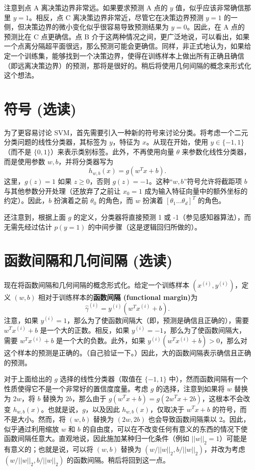 注意到点 A 离决策边界非常远。如果要求预测 A 点的 $y$ 值，似乎应该非常确信那里 $y=1$。相反，点 C 离决策边界非常近，尽管它在决策边界预测 $y=1$ 的一侧，但决策边界的微小变化似乎很容易导致预测结果为 $y=0$。因此，在 A 点的预测比在 C 点更确信。点 B 介于这两种情况之间，更广泛地说，可以看出，如果一个点离分隔超平面很远，那么预测可能会更确信。同样，非正式地认为，如果给定一个训练集，能够找到一个决策边界，使得在训练样本上做出所有正确且确信（即远离决策边界）的预测，那将是很好的。稍后将使用几何间隔的概念来形式化这个想法。

\section{符号 (选读)}

为了更容易讨论 SVM，首先需要引入一种新的符号来讨论分类。将考虑一个二元分类问题的线性分类器，其标签为 $y$，特征为 $x$。从现在开始，使用 $y \in \{-1, 1\}$（而不是 $\{0, 1\}$）来表示类别标签。此外，不再使用向量 $\theta$ 来参数化线性分类器，而是使用参数 $w, b$，并将分类器写为
\[
    h_{w,b}(x) = g(w^T x + b).
\]
这里，$g(z) = 1$ 如果 $z \ge 0$，否则 $g(z) = -1$。这种“$w, b$”符号允许将截距项 $b$ 与其他参数分开处理（还放弃了之前让 $x_0 = 1$ 成为输入特征向量中的额外坐标的约定）。因此，$b$ 扮演着之前 $\theta_0$ 的角色，而 $w$ 扮演着 $[\theta_1 \dots \theta_d]^T$ 的角色。

还注意到，根据上面 $g$ 的定义，分类器将直接预测 1 或 -1（参见感知器算法），而无需先经过估计 $p(y=1)$ 的中间步骤（这是逻辑回归所做的）。

\section{函数间隔和几何间隔 (选读)}\label{sec:6.3}

现在将函数间隔和几何间隔的概念形式化。给定一个训练样本 $(x^{(i)}, y^{(i)})$，定义 $(w,b)$ 相对于训练样本的\textbf{函数间隔 (functional margin)}为
\[
    \hat{\gamma}^{(i)} = y^{(i)}(w^T x^{(i)} + b).
\]
注意，如果 $y^{(i)} = 1$，那么为了使函数间隔大（即，预测是确信且正确的），需要 $w^T x^{(i)} + b$ 是一个大的正数。相反，如果 $y^{(i)} = -1$，那么为了使函数间隔大，需要 $w^T x^{(i)} + b$ 是一个大的负数。此外，如果 $y^{(i)}(w^T x^{(i)} + b) > 0$，那么对这个样本的预测是正确的。（自己验证一下。）因此，大的函数间隔表示确信且正确的预测。

对于上面给出的 $g$ 选择的线性分类器（取值在 $\{-1, 1\}$ 中），然而函数间隔有一个性质使得它不是一个非常好的置信度度量。考虑 $g$ 的选择，注意到如果将 $w$ 替换为 $2w$，将 $b$ 替换为 $2b$，那么由于 $g(w^T x + b) = g(2w^T x + 2b)$，这根本不会改变 $h_{w,b}(x)$。也就是说，$g$，以及因此 $h_{w,b}(x)$，仅取决于 $w^T x + b$ 的符号，而不是大小。然而，将 $(w,b)$ 替换为 $(2w, 2b)$ 也会导致函数间隔乘以 2。因此，似乎通过利用缩放 $w$ 和 $b$ 的自由度，可以在不改变任何有意义的东西的情况下使函数间隔任意大。直观地说，因此施加某种归一化条件（例如 $||w||_2 = 1$）可能是有意义的；也就是说，可以将 $(w,b)$ 替换为 $(w/||w||_2, b/||w||_2)$，并改为考虑 $(w/||w||_2, b/||w||_2)$ 的函数间隔。稍后将回到这一点。

